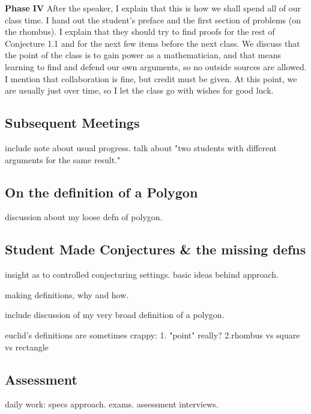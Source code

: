 \documentclass{tufte-handout}
\theoremstyle{definition}
\begin{document}
\begin{compactdesc}
\item[\textbf{Phase IV}] After the speaker, I explain that this is how we shall spend all of our class time.
I hand out the student's preface and the first section of problems (on the rhombus).
I explain that they should try to find proofs for the rest of Conjecture 1.1 and for the next few items before the next class.
We discuss that the point of the class is to gain power as a mathematician, and that means learning to find and defend our own arguments, so no outside sources are allowed.
I mention that collaboration is fine, but credit must be given.
At this point, we are usually just over time, so I let the class go with wishes for good luck.\\[.1in]
\end{compactdesc}

\subsection{Subsequent Meetings}

include note about usual progress. talk about "two students with different arguments for the same result."

\subsection{On the definition of a Polygon}

discussion about my loose defn of polygon.

\subsection{Student Made Conjectures \& the missing defns}

insight as to controlled conjecturing settings. basic ideas behind approach.


making definitions, why and how. 

include discussion of my very broad definition of a polygon.

euclid's definitions are sometimes crappy:
1. "point" really?
2.rhombus vs square vs rectangle




\subsection{Assessment}

daily work: specs approach. exams. assessment interviews.\\
\end{document}
